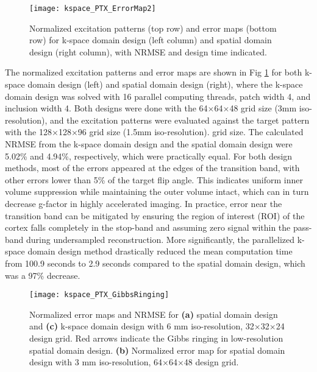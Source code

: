 \begin{figure}
	\centering
	\texttt{[image: kspace\_PTX\_ErrorMap2]}
	\caption{Normalized excitation patterns (top row) and error maps (bottom row) for k-space domain design (left column) and spatial domain design (right column), with NRMSE and design time indicated.}
	\label{fig:ErrorMap}
\end{figure}
The normalized excitation patterns and error maps are shown in Fig \ref{fig:ErrorMap} for both k-space domain design (left) and spatial domain design (right), where the k-space domain design was solved with 16 parallel computing threads, patch width 4, and inclusion width 4. 
Both designs were done with the 64$\times$64$\times$48 grid size (3mm iso-resolution), and the excitation patterns were evaluated against the target pattern with the 128$\times$128$\times$96 grid size (1.5mm iso-resolution).  grid size. 
The calculated NRMSE from the k-space domain design and the spatial domain design were 5.02\% and 4.94\%, respectively, which were practically equal. For both design methods, most of the errors appeared at the edges of the transition band, with other errors lower than 5\% of the target flip angle. This indicates uniform inner volume suppression while maintaining the outer volume intact, which can in turn decrease g-factor in highly accelerated imaging. In practice, error near the transition band can be mitigated by ensuring the region of interest (ROI) of the cortex falls completely in the stop-band and assuming zero signal within the pass-band during undersampled reconstruction. More significantly, the parallelized k-space domain design method drastically reduced the mean computation time from 100.9 seconds to 2.9 seconds compared to the spatial domain design, which was a 97\% decrease.

\begin{figure}
	\centering
	\texttt{[image: kspace\_PTX\_GibbsRinging]}
	\caption{Normalized error maps and NRMSE for \textbf{(a)} spatial domain design and \textbf{(c)} k-space domain design with 6 mm iso-resolution, 32$\times$32$\times$24 design grid. Red arrows indicate the Gibbs ringing in low-resolution spatial domain design. \textbf{(b)} Normalized error map for spatial domain design with 3 mm iso-resolution, 64$\times$64$\times$48 design grid.}
	\label{fig:GibbsRing}
\end{figure}

